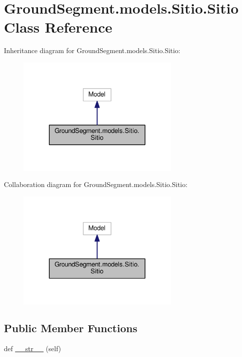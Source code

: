 \hypertarget{class_ground_segment_1_1models_1_1_sitio_1_1_sitio}{}\section{Ground\+Segment.\+models.\+Sitio.\+Sitio Class Reference}
\label{class_ground_segment_1_1models_1_1_sitio_1_1_sitio}


Inheritance diagram for Ground\+Segment.\+models.\+Sitio.\+Sitio\+:\nopagebreak
\begin{figure}[H]
\begin{center}
\leavevmode
\includegraphics[width=227pt]{class_ground_segment_1_1models_1_1_sitio_1_1_sitio__inherit__graph}
\end{center}
\end{figure}


Collaboration diagram for Ground\+Segment.\+models.\+Sitio.\+Sitio\+:\nopagebreak
\begin{figure}[H]
\begin{center}
\leavevmode
\includegraphics[width=227pt]{class_ground_segment_1_1models_1_1_sitio_1_1_sitio__coll__graph}
\end{center}
\end{figure}
\subsection*{Public Member Functions}
\begin{DoxyCompactItemize}
\item 
def \hyperlink{class_ground_segment_1_1models_1_1_sitio_1_1_sitio_a76b0e7facd2de38df048e845ebd100ae}{\+\_\+\+\_\+str\+\_\+\+\_\+} (self)
\end{DoxyCompactItemize}
